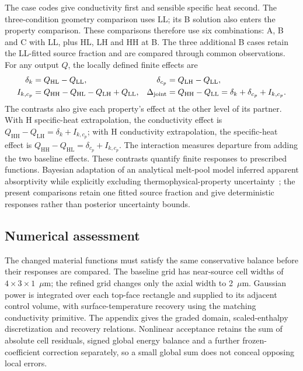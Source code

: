 \documentclass[preprint,12pt]{elsarticle}
\newcommand{\um}{\ensuremath{\mu\mathrm{m}}}
\newcommand{\LL}{\mathrm{LL}}
\newcommand{\HL}{\mathrm{HL}}
\newcommand{\LH}{\mathrm{LH}}
\newcommand{\HH}{\mathrm{HH}}
\begin{document}
The case codes give conductivity first and sensible specific heat second. The three-condition geometry comparison uses LL; its B solution also enters the property comparison. These comparisons therefore use six combinations: A, B and C with LL, plus HL, LH and HH at B. The three additional B cases retain the LL-fitted source fraction and are compared through common observations. For any output $Q$, the locally defined finite effects are
\begin{align}
 \delta_k&=Q_{\HL}-Q_{\LL}, &
 \delta_{c_p}&=Q_{\LH}-Q_{\LL},\\
 I_{k,c_p}&=Q_{\HH}-Q_{\HL}-Q_{\LH}+Q_{\LL}, &
 \Delta_{\rm joint}&=Q_{\HH}-Q_{\LL}=\delta_k+\delta_{c_p}+I_{k,c_p}.
 \label{eq:contrast}
\end{align}
The contrasts also give each property's effect at the other level of its partner. With H specific-heat extrapolation, the conductivity effect is $Q_{\HH}-Q_{\LH}=\delta_k+I_{k,c_p}$; with H conductivity extrapolation, the specific-heat effect is $Q_{\HH}-Q_{\HL}=\delta_{c_p}+I_{k,c_p}$. The interaction measures departure from adding the two baseline effects. These contrasts quantify finite responses to prescribed functions. Bayesian adaptation of an analytical melt-pool model inferred apparent absorptivity while explicitly excluding thermophysical-property uncertainty~\cite{whalen2021}; the present comparisons retain one fitted source fraction and give deterministic responses rather than posterior uncertainty bounds.

\subsection{Numerical assessment}
\label{sec:numerical-assessment}
The changed material functions must satisfy the same conservative balance before their responses are compared. The baseline grid has near-source cell widths of $4\times3\times1$~\um; the refined grid changes only the axial width to 2~\um. Gaussian power is integrated over each top-face rectangle and supplied to its adjacent control volume, with surface-temperature recovery using the matching conductivity primitive. The appendix gives the graded domain, scaled-enthalpy discretization and recovery relations. Nonlinear acceptance retains the sum of absolute cell residuals, signed global energy balance and a further frozen-coefficient correction separately, so a small global sum does not conceal opposing local errors.
\end{document}
